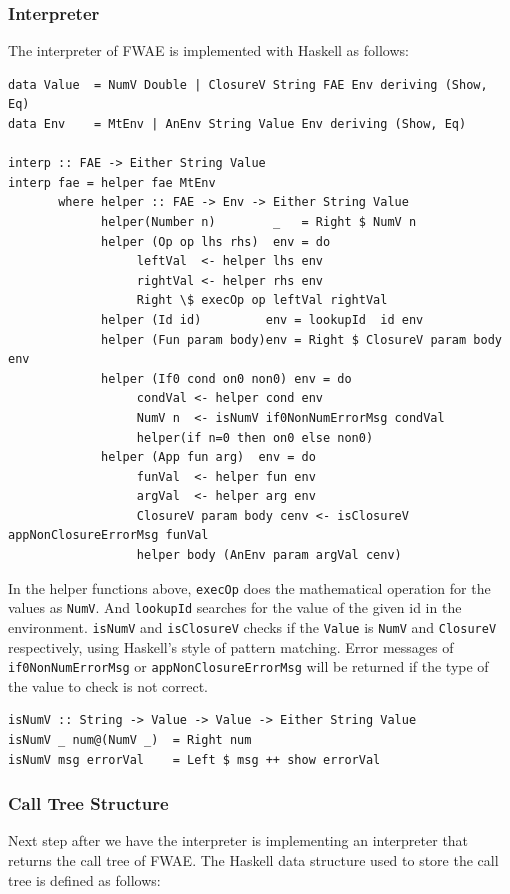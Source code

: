 \documentclass[format=acmlarge, review=false, nonacm=false, screen=true]{acmart}
\begin{document}
\subsubsection{Interpreter}
The interpreter of FWAE is implemented with Haskell as follows:
\begin{verbatim}
data Value  = NumV Double | ClosureV String FAE Env deriving (Show, Eq)
data Env    = MtEnv | AnEnv String Value Env deriving (Show, Eq)

interp :: FAE -> Either String Value
interp fae = helper fae MtEnv
       where helper :: FAE -> Env -> Either String Value
             helper(Number n)        _   = Right $ NumV n
             helper (Op op lhs rhs)  env = do
                  leftVal  <- helper lhs env
                  rightVal <- helper rhs env
                  Right \$ execOp op leftVal rightVal
             helper (Id id)         env = lookupId  id env
             helper (Fun param body)env = Right $ ClosureV param body env
             helper (If0 cond on0 non0) env = do
                  condVal <- helper cond env
                  NumV n  <- isNumV if0NonNumErrorMsg condVal
                  helper(if n=0 then on0 else non0)
             helper (App fun arg)  env = do
                  funVal  <- helper fun env
                  argVal  <- helper arg env
                  ClosureV param body cenv <- isClosureV appNonClosureErrorMsg funVal
                  helper body (AnEnv param argVal cenv)
\end{verbatim}
In the helper functions above, \texttt{execOp} does the mathematical operation for the values as \texttt{NumV}. And \texttt{lookupId} searches for the value of the given id in the environment.
\texttt{isNumV} and \texttt{isClosureV} checks if the \texttt{Value} is \texttt{NumV} and \texttt{ClosureV} respectively, using Haskell's style of pattern matching. Error messages of \texttt{if0NonNumErrorMsg} or \texttt{appNonClosureErrorMsg} will be returned if the type of the value to check is not correct.

\begin{verbatim}
isNumV :: String -> Value -> Value -> Either String Value
isNumV _ num@(NumV _)  = Right num
isNumV msg errorVal    = Left $ msg ++ show errorVal  
\end{verbatim}

\subsubsection{Call Tree Structure}
Next step after we have the interpreter is implementing an interpreter that returns the call tree of FWAE.
The Haskell data structure used to store the call tree is defined as follows:
\end{document}
